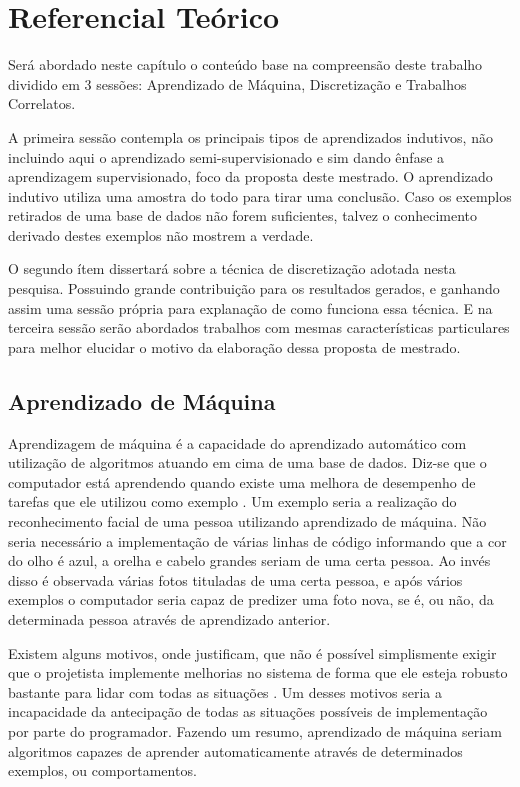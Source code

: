 \chapter{Referencial Teórico}\label{cap:refTeor}

Será abordado neste capítulo o conteúdo base na compreensão deste trabalho dividido em 3 sessões: Aprendizado de Máquina, Discretização e Trabalhos Correlatos. 

A primeira sessão contempla os principais tipos de aprendizados indutivos, não incluindo aqui o aprendizado semi-supervisionado e sim dando ênfase a aprendizagem supervisionado, foco da proposta deste mestrado. O aprendizado indutivo utiliza uma amostra do todo para tirar uma conclusão. Caso os exemplos retirados de uma base de dados não forem suficientes, talvez o conhecimento derivado destes exemplos não mostrem a verdade. 

O segundo ítem dissertará sobre a técnica de discretização adotada nesta pesquisa. Possuindo grande contribuição para os resultados gerados, e ganhando assim uma sessão própria para explanação de como funciona essa técnica. E na terceira sessão serão abordados trabalhos com mesmas características particulares para melhor elucidar o motivo da elaboração dessa proposta de mestrado.



\section{Aprendizado de Máquina}\label{sec:aprendMaq}

Aprendizagem de máquina é a capacidade do aprendizado automático com utilização de algoritmos atuando em cima de uma base de dados.  Diz-se que o computador está aprendendo quando existe uma melhora de desempenho de tarefas que ele utilizou como exemplo \cite{Mitchell1997}. Um exemplo seria a realização do reconhecimento facial de uma pessoa utilizando aprendizado de máquina. Não seria necessário a implementação de várias linhas de código informando que a cor do olho é azul, a orelha e cabelo grandes seriam de uma certa pessoa. Ao invés disso é observada várias fotos tituladas de uma certa pessoa, e após vários exemplos o computador seria capaz de predizer uma foto nova, se é, ou não, da determinada pessoa através de aprendizado anterior.

Existem alguns motivos, onde justificam, que não é possível simplismente exigir que o projetista implemente melhorias no sistema de forma que ele esteja robusto bastante para lidar com todas as situações \cite{RusselStuart.Norvig2013}. Um  desses motivos seria a incapacidade da antecipação de  todas as situações possíveis de implementação por parte do programador. Fazendo um resumo, aprendizado de máquina seriam algoritmos capazes de aprender automaticamente através de  determinados exemplos, ou comportamentos. 

